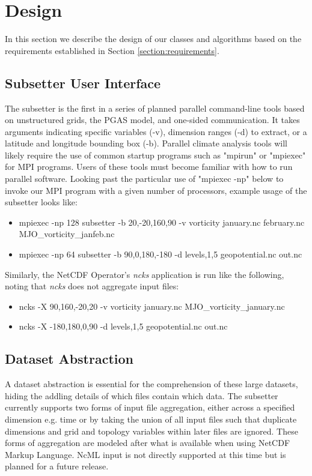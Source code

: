 \section{Design}
\label{section:design}

In this section we describe the design of our classes and algorithms based on
the requirements established in Section \ref{section:requirements}.

\subsection{Subsetter User Interface}

The subsetter is the first in a series of planned parallel command-line tools
based on unstructured grids, the PGAS model, and one-sided communication.  It
takes arguments indicating specific variables (-v), dimension ranges (-d) to
extract, or a latitude and longitude bounding box (-b).  Parallel climate
analysis tools will likely require the use of common startup programs such as
"mpirun" or "mpiexec" for MPI programs.  Users of these tools must become
familiar with how to run parallel software.  Looking past the particular use
of "mpiexec -np" below to invoke our MPI program with a given number of
processors, example usage of the subsetter looks like:

\begin{itemize}
\item mpiexec -np 128 subsetter -b 20,-20,160,90 -v vorticity january.nc february.nc MJO\_vorticity\_janfeb.nc
\item mpiexec -np 64 subsetter -b 90,0,180,-180 -d levels,1,5 geopotential.nc out.nc
\end{itemize}

Similarly, the NetCDF Operator's \emph{ncks} application\cite{NCO} is run
like the following, noting that \emph{ncks} does not aggregate input files:

\begin{itemize}
\item ncks -X 90,160,-20,20 -v vorticity january.nc MJO\_vorticity\_january.nc
\item ncks -X -180,180,0,90 -d levels,1,5 geopotential.nc out.nc
\end{itemize}

\subsection{Dataset Abstraction}

A dataset abstraction is essential for the comprehension of these large
datasets, hiding the addling details of which files contain which data.  The
subsetter currently supports two forms of input file aggregation, either
across a specified dimension e.g. time or by taking the union of all input
files such that duplicate dimensions and grid and topology variables within
later files are ignored.  These forms of aggregation are modeled after what is
available when using NetCDF Markup Language\cite{NcML}.  NcML input is not
directly supported at this time but is planned for a future release. 

